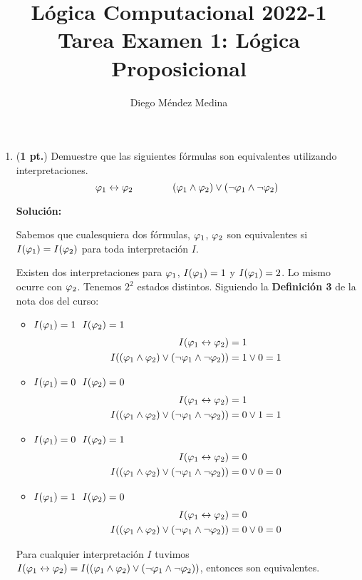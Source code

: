 \documentclass[11pt,letterpaper]{article}
\title{Lógica Computacional 2022-1\\
Tarea Examen 1: Lógica Proposicional}
\author{Diego Méndez Medina}
\date{}
\begin{document}
\maketitle
\thispagestyle{empty}
\begin{enumerate}

\medskip

\item (\textbf{1 pt.}) Demuestre que las siguientes f\'ormulas son 
  equivalentes utilizando 
  interpretaciones.
  \[
  \varphi_1 \leftrightarrow \varphi_2 \qquad\qquad (\varphi_1\land\varphi_2)\lor(\lnot\varphi_1\land\lnot\varphi_2)
  \]


{\bf Solución:}

Sabemos que cualesquiera dos fórmulas, $\varphi_1$, $\varphi_2$ son equivalentes si
$I(\varphi_1) = I(\varphi_2)$ para toda interpretación $I$.

Existen dos interpretaciones para $\varphi_1$, $I(\varphi_1) = 1$ y $I(\varphi_1)=2$.
Lo mismo ocurre con $\varphi_2$. Tenemos $2^2$ estados distintos.
Siguiendo la {\bf Definición 3} de la nota dos del curso:
\begin{multicols}{2}
  \begin{itemize}
  \item $I(\varphi_1) = 1 \ \  I(\varphi_2) = 1$
    \begin{align*}
      I(\varphi_1 \leftrightarrow \varphi_2) &= 1 \\
      I((\varphi_1\land\varphi_2)\lor(\lnot\varphi_1\land\lnot\varphi_2)) &= 1 \lor 0 = 1
    \end{align*}
  \item $I(\varphi_1) = 0 \ \  I(\varphi_2) = 0$
    \begin{align*}
      I(\varphi_1 \leftrightarrow \varphi_2) &= 1 \\
      I((\varphi_1\land\varphi_2)\lor(\lnot\varphi_1\land\lnot\varphi_2)) &= 0 \lor 1 = 1
    \end{align*}
  \item $I(\varphi_1) = 0 \ \  I(\varphi_2) = 1$
    \begin{align*}
      I(\varphi_1 \leftrightarrow \varphi_2) &= 0 \\
      I((\varphi_1\land\varphi_2)\lor(\lnot\varphi_1\land\lnot\varphi_2)) &= 0 \lor 0 = 0
    \end{align*}
    \item $I(\varphi_1) = 1 \ \  I(\varphi_2) = 0$
  \begin{align*}
    I(\varphi_1 \leftrightarrow \varphi_2) &= 0 \\
    I((\varphi_1\land\varphi_2)\lor(\lnot\varphi_1\land\lnot\varphi_2)) &= 0 \lor 0 = 0
  \end{align*}
  \end{itemize}
\end{multicols}
Para cualquier interpretación $I$ tuvimos $I(\varphi_1 \leftrightarrow \varphi_2) =
I((\varphi_1\land\varphi_2)\lor(\lnot\varphi_1\land\lnot\varphi_2))$, entonces son
equivalentes.
\medskip


\end{enumerate}
\end{document}
